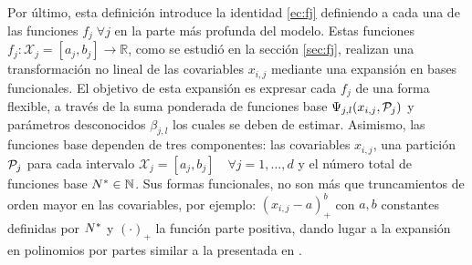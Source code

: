 \documentclass[../Main/Main.tex]{subfiles}
\begin{document}
Por último, esta definición introduce la identidad \eqref{ec:fj} definiendo a cada una de las funciones $f_j \; \forall j$ en la parte más profunda del modelo. Estas funciones $f_j: \mathcal{X}_j = [a_j,b_j] \rightarrow \mathbb{R}$, como se estudió en la sección \ref{sec:fj}, realizan una transformación no lineal de las covariables $x_{i,j}$ mediante una expansión en bases funcionales. El objetivo de esta expansión es expresar cada $f_j$ de una forma flexible, a través de la suma ponderada de funciones base $\Psi_{j,l}(x_{i,j},\P_j)$ y parámetros desconocidos $\beta_{j,l}$ los cuales se deben de estimar. Asimismo, las funciones base dependen de tres componentes: las covariables $x_{i,j}$, una partición $\P_j$ para cada intervalo $\mathcal{X}_j = [a_j, b_j] \quad \forall j = 1,\ldots,d$ y el número total de funciones base $\N\in\mathbb{N}$. Sus formas funcionales, no son más que truncamientos de orden mayor en las covariables, por ejemplo: $(x_{i,j} - a)_+^b$ con $a,b$ constantes definidas por $\N$ y $(\cdot)_+$ la función parte positiva, dando lugar a la expansión en  
polinomios por partes similar a la presentada en \citet{mallik1998automatic}.
\end{document}
